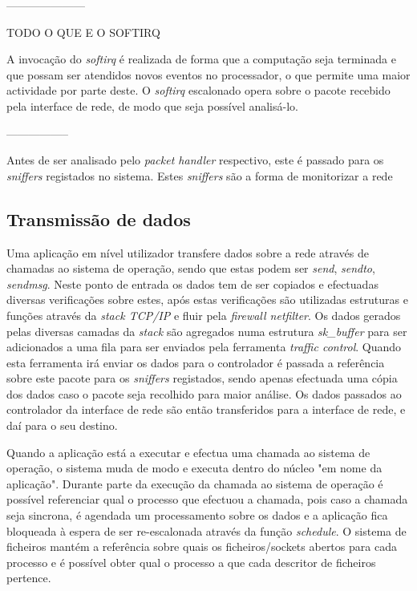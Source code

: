---------------------

TODO
O QUE E O SOFTIRQ

A invocação do \textit{softirq} é realizada de forma que a computação seja terminada e que possam ser atendidos novos eventos no processador, o que permite uma maior actividade por parte deste.
O \textit{softirq} escalonado opera sobre o pacote recebido pela interface de rede, de modo que seja possível analisá-lo.

-----------------

Antes de ser analisado pelo \textit{packet handler} respectivo, este é passado para os \textit{sniffers} registados no sistema.
Estes \textit{sniffers} são a forma de monitorizar a rede

\subsection{Transmissão de dados}

Uma aplicação em nível utilizador transfere dados sobre a rede através de chamadas ao sistema de operação, sendo que estas podem ser \textit{send}, \textit{sendto}, \textit{sendmsg}.
 Neste ponto de entrada os dados tem de ser copiados e efectuadas diversas verificações sobre estes, após estas verificações são utilizadas estruturas e funções através da \textit{stack TCP/IP} e fluir pela \textit{firewall netfilter}.
 Os dados gerados pelas diversas camadas da \textit{stack} são agregados numa estrutura \textit{sk\_buffer} para ser adicionados a uma fila para ser enviados pela ferramenta \textit{traffic control}.
 Quando esta ferramenta irá enviar os dados para o controlador é passada a referência sobre este pacote para os \textit{sniffers} registados, sendo apenas efectuada uma cópia dos dados caso o pacote seja recolhido para maior análise. Os dados passados ao controlador da interface de rede são então transferidos para a interface de rede, e daí para o seu destino.

Quando a aplicação está a executar e efectua uma chamada ao sistema de operação, o sistema muda de modo e executa dentro do núcleo "em nome da aplicação".
 Durante parte da execução da chamada ao sistema de operação é possível referenciar qual o processo que efectuou a chamada, pois caso a chamada seja sincrona, é agendada um processamento sobre os dados e a aplicação fica bloqueada à espera de ser re-escalonada através da função \textit{schedule}.
 O sistema de ficheiros mantém a referência sobre quais os ficheiros/sockets abertos para cada processo e é possível obter qual o processo a que cada descritor de ficheiros pertence. %

